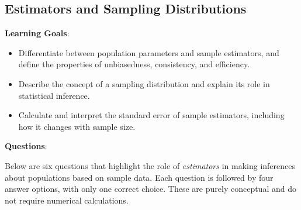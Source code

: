 \documentclass{article}
\begin{document}
\subsection{Estimators and Sampling Distributions}
\textbf{Learning Goals}:
\begin{itemize}
    \item Differentiate between population parameters and sample estimators, and define the properties of unbiasedness, consistency, and efficiency.
    \item Describe the concept of a sampling distribution and explain its role in statistical inference.
    \item Calculate and interpret the standard error of sample estimators, including how it changes with sample size.
\end{itemize}

\textbf{Questions}:

Below are six questions that highlight the role of \emph{estimators} in making inferences about populations based on sample data. Each question is followed by four answer options, with only one correct choice. These are purely conceptual and do not require numerical calculations.
\end{document}

